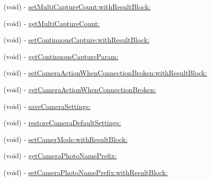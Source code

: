 \begin{DoxyCompactItemize}
\item 
(void) -\/ \hyperlink{category_d_j_i_camera_07_camera_settings_08_a24deec8c2d2c3400fb429d3970b118a8}{set\+Multi\+Capture\+Count\+:with\+Result\+Block\+:}
\item 
(void) -\/ \hyperlink{category_d_j_i_camera_07_camera_settings_08_aadf6c311c34ca3350c499ffebfa56360}{get\+Multi\+Capture\+Count\+:}
\item 
(void) -\/ \hyperlink{category_d_j_i_camera_07_camera_settings_08_a1778f87e60ea80287eeac26bc5ce20c1}{set\+Continuous\+Capture\+:with\+Result\+Block\+:}
\item 
(void) -\/ \hyperlink{category_d_j_i_camera_07_camera_settings_08_a24a0b6d29efc68288434cc7f8dd9820a}{get\+Continuous\+Capture\+Param\+:}
\item 
(void) -\/ \hyperlink{category_d_j_i_camera_07_camera_settings_08_a71e8465d77880dbd1e6503b1c053a3c8}{set\+Camera\+Action\+When\+Connection\+Broken\+:with\+Result\+Block\+:}
\item 
(void) -\/ \hyperlink{category_d_j_i_camera_07_camera_settings_08_ad0a73beaa9c1a8f4d3f671cd502709a4}{get\+Camera\+Action\+When\+Connection\+Broken\+:}
\item 
(void) -\/ \hyperlink{category_d_j_i_camera_07_camera_settings_08_a6ecf06b591c070b0802c750e146a7083}{save\+Camera\+Settings\+:}
\item 
(void) -\/ \hyperlink{category_d_j_i_camera_07_camera_settings_08_ae9dfbd7729c65f2c2b38375a31741945}{restore\+Camera\+Default\+Settings\+:}
\item 
(void) -\/ \hyperlink{category_d_j_i_camera_07_camera_settings_08_a9c3024a4d659577b916421429a9ed1fe}{set\+Camer\+Mode\+:with\+Result\+Block\+:}
\item 
(void) -\/ \hyperlink{category_d_j_i_camera_07_camera_settings_08_aa7aa0fa592b6b7ffdd403308e7896f71}{get\+Camera\+Photo\+Name\+Prefix\+:}
\item 
(void) -\/ \hyperlink{category_d_j_i_camera_07_camera_settings_08_a9825d0b6c5f400877d1d8761fdd0de57}{set\+Camera\+Photo\+Name\+Prefix\+:with\+Result\+Block\+:}
\end{DoxyCompactItemize}


